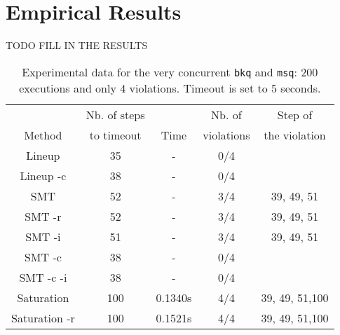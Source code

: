 
\section{Empirical Results}
\label{sec:empirical}

TODO FILL IN THE RESULTS

\begin{table}[t]
  \footnotesize
  \centering
  \setlength{\tabcolsep}{1.8mm}
  \begin{tabular}{ccccc}
   & Nb. of steps  & & Nb. of & Step of  \\
   Method & to timeout & Time & violations & the violation \\
  \hline
  Lineup & 35 & - & 0/4 \\
  Lineup -c & 38 & - & 0/4 \\
  SMT & 52 & - & 3/4 & 39, 49, 51\\
  SMT -r & 52 & - & 3/4 & 39, 49, 51\\
  SMT -i & 51 & - & 3/4 & 39, 49, 51\\
  SMT -c & 38 & - & 0/4 \\
  SMT -c -i & 38 & - & 0/4 \\
  Saturation & 100 & 0.1340s & 4/4 & 39, 49, 51,100\\
  Saturation -r  & 100 & 0.1521s & 4/4 &39, 49, 51,100 
  \end{tabular} 
  \caption{Experimental data for the very concurrent {\tt bkq} and {\tt msq}: 200 executions and only 4 violations.
  Timeout is set to 5 seconds.
    }
  \label{tab:exp:static}
\end{table}



